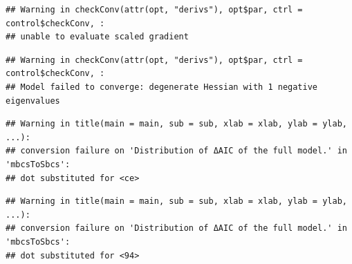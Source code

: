 \documentclass[
]{article}
\newenvironment{Shaded}{\begin{snugshade}}{\end{snugshade}}
\newcommand{\AttributeTok}[1]{\textcolor[rgb]{0.77,0.63,0.00}{#1}}
\newcommand{\CommentTok}[1]{\textcolor[rgb]{0.56,0.35,0.01}{\textit{#1}}}
\newcommand{\FunctionTok}[1]{\textcolor[rgb]{0.00,0.00,0.00}{#1}}
\newcommand{\NormalTok}[1]{#1}
\newcommand{\OtherTok}[1]{\textcolor[rgb]{0.56,0.35,0.01}{#1}}
\newcommand{\SpecialCharTok}[1]{\textcolor[rgb]{0.00,0.00,0.00}{#1}}
\newcommand{\StringTok}[1]{\textcolor[rgb]{0.31,0.60,0.02}{#1}}
\begin{document}
\begin{Shaded}
\end{Shaded}

\begin{verbatim}
## Warning in checkConv(attr(opt, "derivs"), opt$par, ctrl = control$checkConv, :
## unable to evaluate scaled gradient
\end{verbatim}

\begin{verbatim}
## Warning in checkConv(attr(opt, "derivs"), opt$par, ctrl = control$checkConv, :
## Model failed to converge: degenerate Hessian with 1 negative eigenvalues
\end{verbatim}

\begin{Shaded}
\end{Shaded}

\begin{verbatim}
## Warning in title(main = main, sub = sub, xlab = xlab, ylab = ylab, ...):
## conversion failure on 'Distribution of ΔAIC of the full model.' in 'mbcsToSbcs':
## dot substituted for <ce>
\end{verbatim}

\begin{verbatim}
## Warning in title(main = main, sub = sub, xlab = xlab, ylab = ylab, ...):
## conversion failure on 'Distribution of ΔAIC of the full model.' in 'mbcsToSbcs':
## dot substituted for <94>
\end{verbatim}
\end{document}
